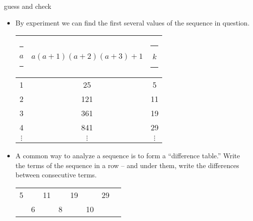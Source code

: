 \documentclass[landscape]{beamer}
\begin{document}
\begin{frame}{guess and check}
\begin{itemize}
\item By experiment we can find the first several values of the sequence in question. \pause

\begin{tabular}{c|c|c}
\rule[-6pt]{0pt}{20pt} \rule{12pt}{0pt} $a$ \rule{12pt}{0pt} & $a(a+1)(a+2)(a+3)+1$ & \rule{12pt}{0pt} $k$ \rule{12pt}{0pt} \\ \hline
1 & 25 & 5 \\
2 & 121 & 11 \\
3 & 361 & 19 \\
4 & 841 & 29 \\
$\vdots$ & $\vdots$ & $\vdots$ \\
\end{tabular}
\pause
\item A common way to analyze a sequence is to form a ``difference table.'' \pause \newline
Write the terms of the sequence in a row -- and under them, write the differences between consecutive terms. \pause

\vspace{.2in}

\begin{tabular}{cccccccc}
\rule[-6pt]{0pt}{20pt} 5 &   & 11 &   & 19 &    & 29 & \\
\rule[-6pt]{0pt}{20pt}   & 6 &    & 8 &    & 10 &    & \\
\end{tabular}

\end{itemize}
\end{frame}
\end{document}
